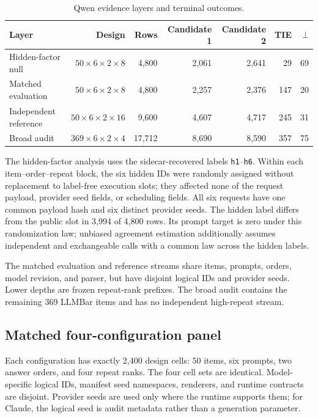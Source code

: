 \documentclass[letterpaper]{article}
\newcommand{\1}{\mathbf 1}
\begin{document}
\begin{table}[t]
\centering
\small
\caption{Qwen evidence layers and terminal outcomes.}
\label{tab:s-qwen-layers}
\begin{tabular}{lrrrrrr}
\toprule
Layer & Design & Rows & Candidate 1 & Candidate 2 & TIE & $\bot$ \\
\midrule
Hidden-factor null & $50\times6\times2\times8$ & 4,800 &
2,061 & 2,641 & 29 & 69 \\
Matched evaluation & $50\times6\times2\times8$ & 4,800 &
2,257 & 2,376 & 147 & 20 \\
Independent reference & $50\times6\times2\times16$ & 9,600 &
4,607 & 4,717 & 245 & 31 \\
Broad audit & $369\times6\times2\times4$ & 17,712 &
8,690 & 8,590 & 357 & 75 \\
\bottomrule
\end{tabular}
\end{table}

The hidden-factor analysis uses the sidecar-recovered labels
\texttt{h1}--\texttt{h6}. Within each item--order--repeat block, the six hidden
IDs were randomly assigned without replacement to label-free execution slots;
they affected none of the request payload, provider seed fields, or scheduling
fields. All six requests have one common payload hash and six distinct
provider seeds. The hidden label differs from the public slot in 3,994 of
4,800 rows. Its prompt target is zero under this randomization law; unbiased
agreement estimation additionally assumes independent and exchangeable calls
with a common law across the hidden labels.

The matched evaluation and reference streams share items, prompts, orders,
model revision, and parser, but have disjoint logical IDs and provider seeds.
Lower depths are frozen repeat-rank prefixes. The broad audit contains the
remaining 369 LLMBar items and has no independent high-repeat stream.

\subsection{Matched four-configuration panel}

Each configuration has exactly 2,400 design cells:
$50$ items, six prompts, two answer orders, and four repeat ranks. The four
cell sets are identical. Model-specific logical IDs, manifest seed
namespaces, renderers, and runtime contracts are disjoint. Provider seeds are
used only where the runtime supports them; for Claude, the logical seed is
audit metadata rather than a generation parameter.
\end{document}
